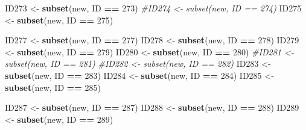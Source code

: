 \documentclass[
]{book}
\newenvironment{Shaded}{\begin{snugshade}}{\end{snugshade}}
\newcommand{\CommentTok}[1]{\textcolor[rgb]{0.56,0.35,0.01}{\textit{#1}}}
\newcommand{\DecValTok}[1]{\textcolor[rgb]{0.00,0.00,0.81}{#1}}
\newcommand{\KeywordTok}[1]{\textcolor[rgb]{0.13,0.29,0.53}{\textbf{#1}}}
\newcommand{\NormalTok}[1]{#1}
\newcommand{\OperatorTok}[1]{\textcolor[rgb]{0.81,0.36,0.00}{\textbf{#1}}}
\newcommand{\StringTok}[1]{\textcolor[rgb]{0.31,0.60,0.02}{#1}}
\begin{document}
\begin{Shaded}
\begin{Highlighting}[]
{{{{{{\NormalTok{ID273 <-}\StringTok{ }\KeywordTok{subset}\NormalTok{(new, ID }\OperatorTok{==}\StringTok{ }\DecValTok{273}\NormalTok{)}
\CommentTok{#ID274 <- subset(new, ID == 274)}
\NormalTok{ID275 <-}\StringTok{ }\KeywordTok{subset}\NormalTok{(new, ID }\OperatorTok{==}\StringTok{ }\DecValTok{275}\NormalTok{)}

\NormalTok{ID277 <-}\StringTok{ }\KeywordTok{subset}\NormalTok{(new, ID }\OperatorTok{==}\StringTok{ }\DecValTok{277}\NormalTok{)}
\NormalTok{ID278 <-}\StringTok{ }\KeywordTok{subset}\NormalTok{(new, ID }\OperatorTok{==}\StringTok{ }\DecValTok{278}\NormalTok{)}
\NormalTok{ID279 <-}\StringTok{ }\KeywordTok{subset}\NormalTok{(new, ID }\OperatorTok{==}\StringTok{ }\DecValTok{279}\NormalTok{)}
\NormalTok{ID280 <-}\StringTok{ }\KeywordTok{subset}\NormalTok{(new, ID }\OperatorTok{==}\StringTok{ }\DecValTok{280}\NormalTok{)}
\CommentTok{#ID281 <- subset(new, ID == 281)}
\CommentTok{#ID282 <- subset(new, ID == 282)}
\NormalTok{ID283 <-}\StringTok{ }\KeywordTok{subset}\NormalTok{(new, ID }\OperatorTok{==}\StringTok{ }\DecValTok{283}\NormalTok{)}
\NormalTok{ID284 <-}\StringTok{ }\KeywordTok{subset}\NormalTok{(new, ID }\OperatorTok{==}\StringTok{ }\DecValTok{284}\NormalTok{)}
\NormalTok{ID285 <-}\StringTok{ }\KeywordTok{subset}\NormalTok{(new, ID }\OperatorTok{==}\StringTok{ }\DecValTok{285}\NormalTok{)}

\NormalTok{ID287 <-}\StringTok{ }\KeywordTok{subset}\NormalTok{(new, ID }\OperatorTok{==}\StringTok{ }\DecValTok{287}\NormalTok{)}
\NormalTok{ID288 <-}\StringTok{ }\KeywordTok{subset}\NormalTok{(new, ID }\OperatorTok{==}\StringTok{ }\DecValTok{288}\NormalTok{)}
\NormalTok{ID289 <-}\StringTok{ }\KeywordTok{subset}\NormalTok{(new, ID }\OperatorTok{==}\StringTok{ }\DecValTok{289}\NormalTok{)}

}}}}}}
\end{Highlighting}
\end{Shaded}
\end{document}
